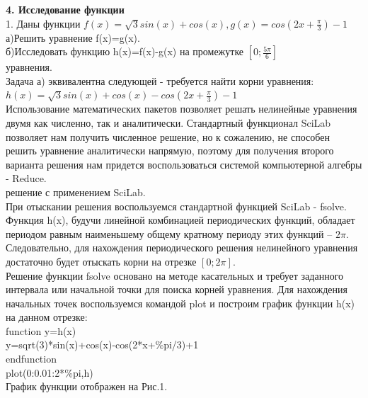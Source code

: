 \documentclass[russian,utf8,nocolumnxxxi,nocolumnxxxii]{eskdtext}
\begin{document}
\newpage
{\bf4. Исследование функции}\\
1. Даны функции $f(x)=\sqrt{3}sin(x)+cos(x),g(x)=cos(2x+\frac{\pi}{3})-1$\\
а)Решить уравнение f(x)=g(x).\\
б)Исследовать функцию h(x)=f(x)-g(x) на промежутке $[0;\frac{5\pi}{6}]$\\
{ уравнения.}\\
Задача а) эквивалентна следующей - требуется найти корни уравнения:\\
$h(x)=\sqrt{3}sin(x)+cos(x)-cos(2x+\frac{\pi}{3})-1$\\
Использование математических пакетов позволяет решать нелинейные уравнения двумя как численно, так и аналитически. Стандартный функционал SciLab позволяет нам получить численное решение, но к сожалению, не способен решить уравнение аналитически напрямую, поэтому для получения второго варианта решения нам придется воспользоваться системой компьютерной алгебры - Reduce.\\
{ решение с применением SciLab.}\\
При отыскании решения воспользуемся стандартной функцией SciLab - fsolve.\\
Функция h(x), будучи линейной комбинацией периодических функций, обладает периодом равным наименьшему общему кратному периоду этих функций -- $2\pi$. Следовательно, для нахождения периодического решения нелинейного уравнения достаточно будет отыскать корни на отрезке $[0; 2\pi]$. \\
Решение функции fsolve основано на методе касательных и требует заданного интервала или начальной точки для поиска корней уравнения. Для нахождения начальных точек воспользуемся командой plot и построим график функции h(x) на данном отрезке:\\
function y=h(x)\\
y=sqrt(3)*sin(x)+cos(x)-cos(2*x+\%pi/3)+1\\
endfunction\\
plot(0:0.01:2*\%pi,h)\\
График функции отображен на Рис.1.
\newpage
\end{document}
